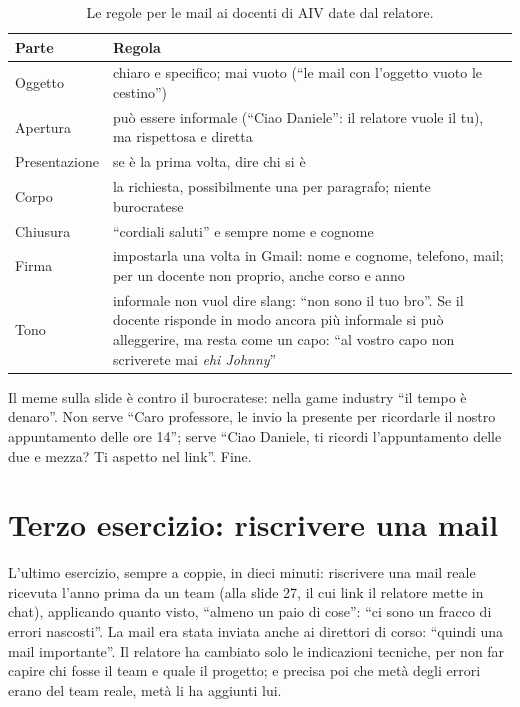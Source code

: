 \begin{table}[htbp]
\centering
\small
\begin{tabular}{@{}lp{9.8cm}@{}}
\toprule
\textbf{Parte} & \textbf{Regola} \\
\midrule
Oggetto & chiaro e specifico; mai vuoto (``le mail con l'oggetto vuoto le
cestino'') \\
Apertura & può essere informale (``Ciao Daniele'': il relatore vuole il tu),
ma rispettosa e diretta \\
Presentazione & se è la prima volta, dire chi si è \\
Corpo & la richiesta, possibilmente una per paragrafo; niente burocratese \\
Chiusura & ``cordiali saluti'' e sempre nome e cognome \\
Firma & impostarla una volta in Gmail: nome e cognome, telefono, mail; per un
docente non proprio, anche corso e anno \\
Tono & informale non vuol dire slang: ``non sono il tuo bro''. Se il docente
risponde in modo ancora più informale si può alleggerire, ma resta come un
capo: ``al vostro capo non scriverete mai \emph{ehi Johnny}'' \\
\bottomrule
\end{tabular}
\caption{Le regole per le mail ai docenti di AIV date dal relatore.}
\label{pt:tab:mail}
\end{table}

Il meme sulla slide è contro il burocratese: nella game industry ``il tempo è
denaro''. Non serve ``Caro professore, le invio la presente per ricordarle il
nostro appuntamento delle ore 14''; serve ``Ciao Daniele, ti ricordi
l'appuntamento delle due e mezza? Ti aspetto nel link''. Fine.

\section{Terzo esercizio: riscrivere una mail}
\label{pt:sec:es3}

L'ultimo esercizio, sempre a coppie, in dieci minuti: riscrivere una mail reale
ricevuta l'anno prima da un team (alla slide 27, il cui link il relatore mette
in chat), applicando quanto visto, ``almeno un paio di cose'': ``ci sono un
fracco di errori nascosti''. La mail era stata inviata anche ai direttori di
corso: ``quindi una mail importante''. Il relatore ha cambiato solo le
indicazioni tecniche, per non far capire chi fosse il team e quale il progetto;
e precisa poi che metà degli errori erano del team reale, metà li ha aggiunti
lui.

